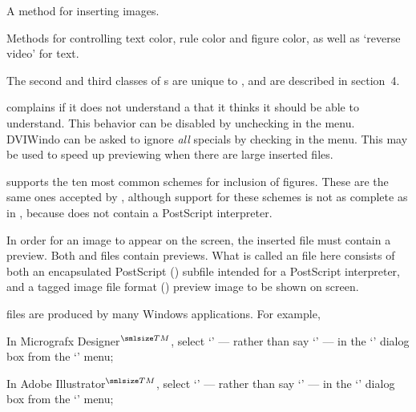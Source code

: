 \bpar A method for inserting {\TIFF} images.

\bpar Methods for controlling text color, rule color and figure color, 
as well as `reverse video' for text.

\endbullets 

The second and third classes of {\lavender\verb@\special@\revert}s are
unique to {\DVIWindo}, and are described in section~4. %

{\DVIWindo} complains if it does not understand a 
{\lavender\verb@\special@\revert}
that it thinks it should be able to understand.
This behavior can be disabled by unchecking 
in the  menu.
{DVIWindo} can be asked to ignore {\it all} specials by checking
 in the  menu.
This may be used to speed up previewing when there are large inserted
{\TIFF} files. 


{\DVIWindo} supports the ten most common schemes for inclusion of figures.
These are the same ones accepted by {\DVIPSONE}, although support for
these schemes is not as complete as in {\DVIPSONE}, because {\DVIWindo}
does not contain a PostScript interpreter.

\unvpar

In order for an image to appear on the screen, 
the inserted file must contain a preview.
Both {\EPSF} and {\EPSI} files contain previews.
What is called an {\EPSF} file here consists of both an encapsulated
PostScript ({\EPS}) subfile intended for a PostScript interpreter, and
a tagged image file format ({\TIFF}) preview image to be shown on screen.  


{\EPSF} files are produced by many Windows applications.
For example,

\beginbullets

\bpar In Micrografx Designer$^{\smlsize TM}$, select 
`' --- 
rather than say `' --- in
the `' dialog box from the `' menu;

\bpar In Adobe Illustrator$^{\smlsize TM}$, 
select `' --- 
rather than say `' ---
in the `' dialog box from the `' menu;

